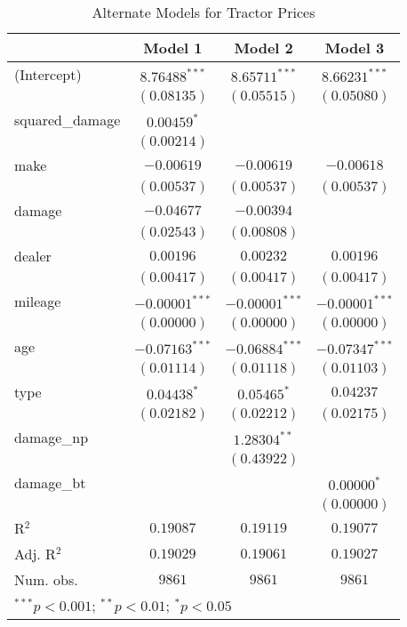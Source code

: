 
\begin{table}
\begin{center}
\begin{tabular}{l c c c}
\hline
 & Model 1 & Model 2 & Model 3 \\
\hline
(Intercept)     & $8.76488^{***}$  & $8.65711^{***}$  & $8.66231^{***}$  \\
                & $(0.08135)$      & $(0.05515)$      & $(0.05080)$      \\
squared\_damage & $0.00459^{*}$    &                  &                  \\
                & $(0.00214)$      &                  &                  \\
make            & $-0.00619$       & $-0.00619$       & $-0.00618$       \\
                & $(0.00537)$      & $(0.00537)$      & $(0.00537)$      \\
damage          & $-0.04677$       & $-0.00394$       &                  \\
                & $(0.02543)$      & $(0.00808)$      &                  \\
dealer          & $0.00196$        & $0.00232$        & $0.00196$        \\
                & $(0.00417)$      & $(0.00417)$      & $(0.00417)$      \\
mileage         & $-0.00001^{***}$ & $-0.00001^{***}$ & $-0.00001^{***}$ \\
                & $(0.00000)$      & $(0.00000)$      & $(0.00000)$      \\
age             & $-0.07163^{***}$ & $-0.06884^{***}$ & $-0.07347^{***}$ \\
                & $(0.01114)$      & $(0.01118)$      & $(0.01103)$      \\
type            & $0.04438^{*}$    & $0.05465^{*}$    & $0.04237$        \\
                & $(0.02182)$      & $(0.02212)$      & $(0.02175)$      \\
damage\_np      &                  & $1.28304^{**}$   &                  \\
                &                  & $(0.43922)$      &                  \\
damage\_bt      &                  &                  & $0.00000^{*}$    \\
                &                  &                  & $(0.00000)$      \\
\hline
R$^2$           & $0.19087$        & $0.19119$        & $0.19077$        \\
Adj. R$^2$      & $0.19029$        & $0.19061$        & $0.19027$        \\
Num. obs.       & $9861$           & $9861$           & $9861$           \\
\hline
\multicolumn{4}{l}{\scriptsize{$^{***}p<0.001$; $^{**}p<0.01$; $^{*}p<0.05$}}
\end{tabular}
\caption{Alternate Models for Tractor Prices}
\label{tab:reg_sq_horse_sp_bt}
\end{center}
\end{table}

